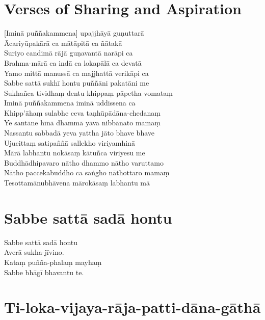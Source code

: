 \chapter{Verses of Sharing and Aspiration}

\begin{leader}
\end{leader}

[Iminā puññakammena] upajjhāyā guṇuttarā\\
Ācariyūpakārā ca mātāpitā ca ñātakā\\
Suriyo candimā rājā guṇavantā narāpi ca\\
Brahma-mārā ca indā ca lokapālā ca devatā\\
Yamo mittā manussā ca majjhattā verikāpi ca\\
Sabbe sattā sukhī hontu puññāni pakatāni me\\
Sukhañca tividhaṃ dentu khippaṃ pāpetha vomataṃ\\
Iminā puññakammena iminā uddissena ca\\
Khipp'āhaṃ sulabhe ceva taṇhūpādāna-chedanaṃ\\
Ye santāne hīnā dhammā yāva nibbānato mamaṃ\\
Nassantu sabbadā yeva yattha jāto bhave bhave\\
Ujucittaṃ satipaññā sallekho viriyamhinā\\
Mārā labhantu nokāsaṃ kātuñca viriyesu me\\
Buddhādhipavaro nātho dhammo nātho varuttamo\\
Nātho paccekabuddho ca saṅgho nāthottaro mamaṃ\\
Tesottamānubhāvena mārokāsaṃ labhantu mā

\chapter{Sabbe sattā sadā hontu}

Sabbe sattā sadā hontu\\
Averā sukha-jīvino.\\
Kataṃ puñña-phalaṃ mayhaṃ\\
Sabbe bhāgī bhavantu te.

\chapter{Ti-loka-vijaya-rāja-patti-dāna-gāthā}

